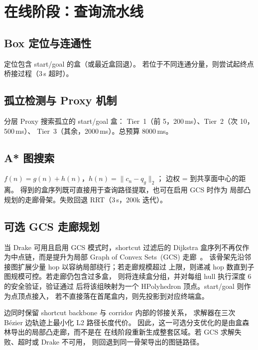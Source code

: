 \documentclass[journal]{IEEEtran}
\begin{document}
\section{在线阶段：查询流水线}\label{sec:query}

\subsection{Box 定位与连通性}

定位包含 start/goal 的盒（或最近盒回退）。
若位于不同连通分量，则尝试起终点桥接过程（3\,s 超时）。

\subsection{孤立检测与 Proxy 机制}

分层 Proxy 搜索孤立的 start/goal 盒：
Tier~1（前 5，200\,ms）、Tier~2（次 10，500\,ms）、
Tier~3（其余，2000\,ms）。总预算 8000\,ms。

\subsection{A* 图搜索}

$f(n) = g(n) + h(n)$，$h(n) = \|c_n - q_g\|_2$；
边权 = 到共享面中心的距离。
得到的盒序列既可直接用于查询路径提取，也可在启用 GCS 时作为
局部凸规划的走廊骨架。失败回退 RRT（3\,s，200k 迭代）。

\subsection{可选 GCS 走廊规划}

当 Drake 可用且启用 GCS 模式时，shortcut 过滤后的 Dijkstra
盒序列不再仅作为中点链，而是提升为局部
Graph of Convex Sets~(GCS) 走廊~\cite{marcucci2024motion}。
该骨架先沿邻接图扩展少量 hop 以容纳局部绕行；若走廊规模超过
上限，则递减 hop 数直到子图规模可控。若走廊仍包含过多盒，
则将连续盒分组，并对每组 hull 执行深度 6 的安全验证，验证通过
后将该组映射为一个 HPolyhedron 顶点。start/goal 则作为点顶点接入，
若不直接落在首尾盒内，则先投影到对应终端盒。

边同时保留 shortcut backbone 与 corridor 内部的邻接关系，
求解器在三次 B\'ezier 边轨迹上最小化 L2 路径长度代价。
因此，这一可选分支优化的是由盒森林导出的局部凸走廊，而不是在
在线阶段重新生成整套区域。若 GCS 求解失败、超时或 Drake 不可用，
则回退到同一骨架导出的图链路径。
\end{document}
